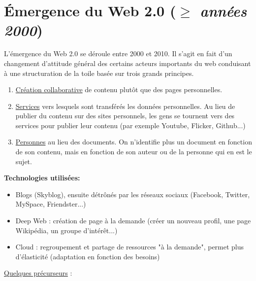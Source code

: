 \section{Émergence du Web 2.0 (\textit{$\ge$ années 2000})}
L'émergence du Web 2.0 se déroule entre 2000 et 2010. Il s'agit en fait d'un changement d'attitude général des certains acteurs importants du web conduisant à une structuration de la toile basée sur trois grands principes. 
\begin{enumerate}
    \item \underline{Création collaborative} de contenu plutôt que des pages personnelles.
    \item \underline{Services} vers lesquels sont transférés les données personnelles. Au lieu de publier du contenu  sur des sites personnels, les gens se tournent vers des services pour publier leur contenu (par exemple Youtube, Flicker, Github...)
    \item \underline{Personnes} au lieu des documents. On n'identifie plus un document en fonction de son contenu, mais en fonction de son auteur ou de la personne qui en est le sujet.
\end{enumerate} 

\vspace{0.3cm}
\textbf{Technologies utilisées:}
    \begin{itemize}
        \item Blogs (Skyblog), ensuite détrônés par les réseaux sociaux (Facebook, Twitter, MySpace, Friendster...)
        \item Deep Web : création de page à la demande (créer un nouveau profil, une page Wikipédia, un groupe d'intérêt...)
        \item Cloud : regroupement et partage de ressources "à la demande", permet plus d'élasticité (adaptation en fonction des besoins)
    \end{itemize}

\vspace{0.5cm}       

\newpage

\vspace * {0.5cm}
    
    \vspace{0.3cm}
    
    \underline{Quelques précurseurs} :
    
